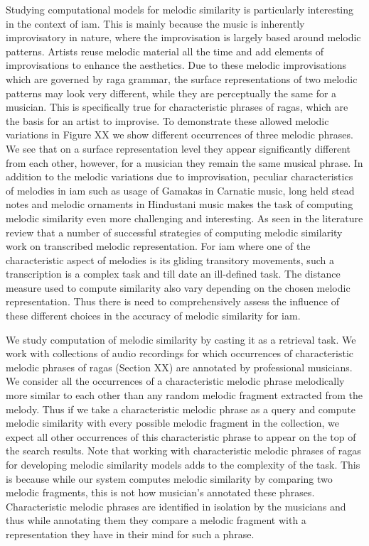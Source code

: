 Studying computational models for melodic similarity is particularly interesting in the context of \gls{iam}. This is mainly because the music is inherently improvisatory in nature, where the improvisation is largely based around melodic patterns. Artists reuse melodic material all the time and add elements of improvisations to enhance the aesthetics. Due to these melodic improvisations which are governed by \gls{raga} grammar, the surface representations of two melodic patterns may look very different, while they are perceptually the same for a musician. This is specifically true for characteristic phrases of \glspl{raga}, which are the basis for an artist to improvise. To demonstrate these allowed melodic variations in Figure XX we show different occurrences of three melodic phrases. We see that on a surface representation level they appear significantly different from each other, however, for a musician they remain the same musical phrase. In addition to the melodic variations due to improvisation, peculiar characteristics of melodies in \gls{iam} such as usage of Gamakas in Carnatic music, long held stead notes and melodic ornaments in Hindustani music makes the task of computing melodic similarity even more challenging and interesting. As seen in the literature review that a number of successful strategies of computing melodic similarity work on transcribed melodic representation. For \gls{iam} where one of the characteristic aspect of melodies is its gliding transitory movements, such a transcription is a complex task and till date an ill-defined task. The distance measure used to compute similarity also vary depending on the chosen melodic representation. Thus there is need to comprehensively assess the influence of these different choices in the accuracy of melodic similarity for \gls{iam}. 

We study computation of melodic similarity by casting it as a retrieval task. We work with collections of audio recordings for which occurrences of characteristic melodic phrases of \glspl{raga} (Section XX) are annotated by professional musicians. We consider all the occurrences of a characteristic melodic phrase melodically more similar to each other than any random melodic fragment extracted from the melody. Thus if we take a characteristic melodic phrase as a query and compute melodic similarity with every possible melodic fragment in the collection, we expect all other occurrences of this characteristic phrase to appear on the top of the search results. Note that working with characteristic melodic phrases of \glspl{raga} for developing melodic similarity models adds to the complexity of the task. This is because while our system computes melodic similarity by comparing two melodic fragments, this is not how musician's annotated these phrases. Characteristic melodic phrases are identified in isolation by the musicians and thus while annotating them they compare a melodic fragment with a representation they have in their mind for such a phrase. 

